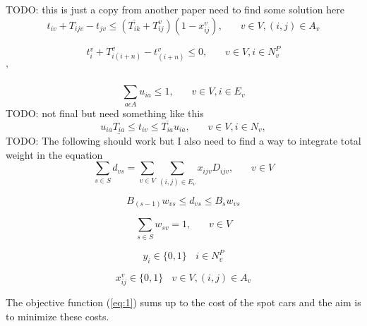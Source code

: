 \documentclass[a4paper,12pt]{article}
\begin{document}
TODO: this is just a copy from another paper need to find some solution here
\begin{equation} \label{eq:14}
    t_{iv} + T_{ijv} - t_{jv} \leq (\overline{T_{ik}} + T_{ij}^v)(1 - x_{ij}^v), ~~~~~~~~ v \in V, (i,j) \in A_v
\end{equation}

\begin{equation} \label{eq:15}
    t_{i}^v + T_{i(i+n)}^v - t_{(i+n)}^v \leq 0, ~~~~~~~~ v \in V, i \in N^P_v
\end{equation}'

\begin{equation} \label{eq:16}
    \sum_{a\epsilon A} u_{ia} \leq 1, ~~~~~~~~ v \in V, i\in E_v
\end{equation}
TODO: not final but need something like this
\begin{equation} \label{eq:17}
    u_{ia}\underline{T_{ia}} \leq t_{iv} \leq  \overline{T_{ia}}u_{ia}, ~~~~~~~~ v \in V, i \in N_v,
\end{equation}
TODO: The following should work but I also need to find a way to integrate total weight in the equation
\begin{equation} \label{eq:18}
    \sum_{s \in S}d_{vs} = \sum_{v \in V} \sum_{(i,j) \in E_v} x_{ijv}D_{ijv},~~~~~~~~ v \in V
\end{equation}

\begin{equation} \label{eq:19}
    B_{(s-1)}w_{vs} \leq d_{vs} \leq B_sw_{vs}
\end{equation}

\begin{equation} \label{eq:20}
 \sum_{s \in S} w_{sv} = 1 ,~~~~~~~~ v \in V
\end{equation}

\begin{equation} \label{eq:21}
y_i \in \{0, 1\} ~~~~ i \in N_v^P
\end{equation}

\begin{equation} \label{eq:22}
x_{ij}^v \in \{0, 1\} ~~~~ v \in V, (i, j) \in A_v
\end{equation}




\par
The objective function (\ref{eq:1}) sums up to the cost of the spot cars and the aim is to minimize these costs. \newline \newline
\end{document}
